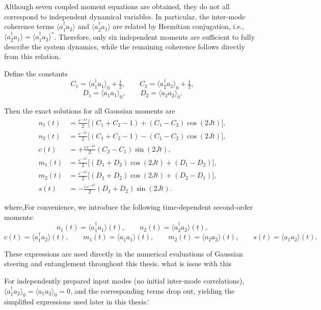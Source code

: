 Although seven coupled moment equations are obtained, they do not all correspond to
independent dynamical variables. In particular, the inter-mode coherence terms
$\langle a_1^\dagger a_2\rangle$ and $\langle a_2^\dagger a_1\rangle$ are related by
Hermitian conjugation, i.e.,
$\langle a_2^\dagger a_1\rangle = \langle a_1^\dagger a_2\rangle^{*}$.
Therefore, only six independent moments are sufficient to fully describe the system
dynamics, while the remaining coherence follows directly from this relation.

Define the constants
\[
C_{1}=\langle a_{1}^{\dagger}a_{1}\rangle_{0}+\tfrac{1}{2},
\qquad
C_{2}=\langle a_{2}^{\dagger}a_{2}\rangle_{0}+\tfrac{1}{2},
\]
\[
D_{1}=\langle a_{1}a_{1}\rangle_{0},
\qquad
D_{2}=\langle a_{2}a_{2}\rangle_{0}.
\]




Then the exact solutions for all Gaussian moments are
\[
\begin{aligned}
	n_{1}(t) &= \frac{e^{-\kappa t}}{2}\Big[(C_{1}+C_{2}-1)
	+(C_{1}-C_{2})\cos(2Jt)\Big],\\[8pt]
	n_{2}(t) &= \frac{e^{-\kappa t}}{2}\Big[(C_{1}+C_{2}-1)
	-(C_{1}-C_{2})\cos(2Jt)\Big],\\[10pt]
	c(t) &= +\frac{i\,e^{-\kappa t}}{2}(C_{2}-C_{1})\sin(2Jt),\\[10pt]
	m_{1}(t) &= \frac{e^{-\kappa t}}{2}\Big[(D_{1}+D_{2})\cos(2Jt)
	+(D_{1}-D_{2})\Big],\\[8pt]
	m_{2}(t) &= \frac{e^{-\kappa t}}{2}\Big[(D_{1}+D_{2})\cos(2Jt)
	+(D_{2}-D_{1})\Big],\\[10pt]
	s(t) &= -\frac{i\,e^{-\kappa t}}{2}(D_{1}+D_{2})\sin(2Jt).
\end{aligned}
\]

where,For convenience, we introduce the following time-dependent second-order moments:
\[
n_{1}(t)=\langle a_{1}^{\dagger}a_{1}\rangle(t),\qquad
n_{2}(t)=\langle a_{2}^{\dagger}a_{2}\rangle(t),
\]
\[
c(t)=\langle a_{1}^{\dagger}a_{2}\rangle(t),\qquad
m_{1}(t)=\langle a_{1}a_{1}\rangle(t),\qquad
m_{2}(t)=\langle a_{2}a_{2}\rangle(t),\qquad
s(t)=\langle a_{1}a_{2}\rangle(t).
\]

These expressions are used directly in the numerical evaluations of
Gaussian steering and entanglement throughout this thesis. what is issue with this

\noindent
For independently prepared input modes (no initial inter-mode correlations),
$\langle a_1^\dagger a_2\rangle_0=\langle a_1 a_2\rangle_0=0$, and the corresponding
terms drop out, yielding the simplified expressions used later in this thesis.`